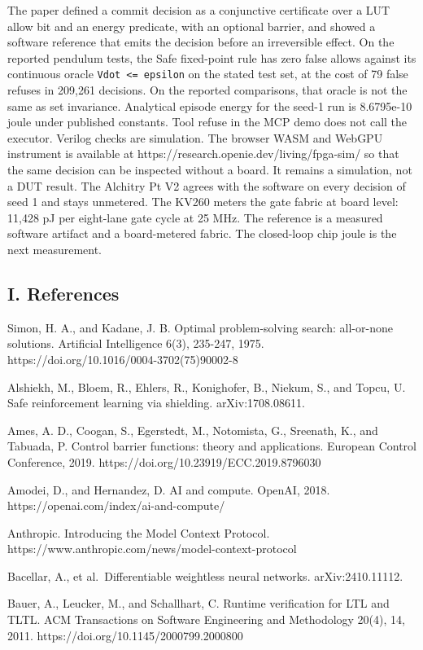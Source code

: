 \documentclass[
  10pt,
]{article}
\newcounter{none} %
\begin{document}
The paper defined a commit decision as a conjunctive certificate over a
LUT allow bit and an energy predicate, with an optional barrier, and
showed a software reference that emits the decision before an
irreversible effect. On the reported pendulum tests, the Safe
fixed-point rule has zero false allows against its continuous oracle
\texttt{Vdot\ \textless{}=\ epsilon} on the stated test set, at the cost
of 79 false refuses in 209,261 decisions. On the reported comparisons,
that oracle is not the same as set invariance. Analytical episode energy
for the seed-1 run is 8.6795e-10 joule under published constants. Tool
refuse in the MCP demo does not call the executor. Verilog checks are
simulation. The browser WASM and WebGPU instrument is available at
https://research.openie.dev/living/fpga-sim/ so that the same decision
can be inspected without a board. It remains a simulation, not a DUT
result. The Alchitry Pt V2 agrees with the software on every decision of
seed 1 and stays unmetered. The KV260 meters the gate fabric at board
level: 11,428 pJ per eight-lane gate cycle at 25 MHz. The reference is a
measured software artifact and a board-metered fabric. The closed-loop
chip joule is the next measurement.

\subsection{I. References}\label{i.-references}

Simon, H. A., and Kadane, J. B. Optimal problem-solving search:
all-or-none solutions. Artificial Intelligence 6(3), 235-247, 1975.
https://doi.org/10.1016/0004-3702(75)90002-8

Alshiekh, M., Bloem, R., Ehlers, R., Konighofer, B., Niekum, S., and
Topcu, U. Safe reinforcement learning via shielding. arXiv:1708.08611.

Ames, A. D., Coogan, S., Egerstedt, M., Notomista, G., Sreenath, K., and
Tabuada, P. Control barrier functions: theory and applications. European
Control Conference, 2019. https://doi.org/10.23919/ECC.2019.8796030

Amodei, D., and Hernandez, D. AI and compute. OpenAI, 2018.
https://openai.com/index/ai-and-compute/

Anthropic. Introducing the Model Context Protocol.
https://www.anthropic.com/news/model-context-protocol

Bacellar, A., et al.~Differentiable weightless neural networks.
arXiv:2410.11112.

Bauer, A., Leucker, M., and Schallhart, C. Runtime verification for LTL
and TLTL. ACM Transactions on Software Engineering and Methodology
20(4), 14, 2011. https://doi.org/10.1145/2000799.2000800
\end{document}
